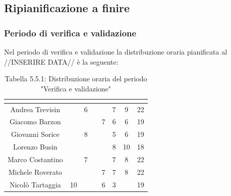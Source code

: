 \subsection{Ripianificazione a finire}

\subsubsection{Periodo di verifica e validazione}
Nel periodo di verifica e validazione la distribuzione oraria pianificata al //INSERIRE DATA// è la seguente:

\renewcommand{\arraystretch}{1.5}
\begin{table}[H]
\begin{center}
\begin{tabular}{|c|c|c|c|c|c|c|c|}
\hline
\rowcolor{title_row}
\textbf{\color{title_text}{Nome}} & \textbf{\color{title_text}{Resp.}} & \textbf{\color{title_text}{Ammi.}} & \textbf{\color{title_text}{Analist.}} & \textbf{\color{title_text}{Progett.}} & \textbf{\color{title_text}{Program.}} & \textbf{\color{title_text}{Verific.}} & \textbf{\color{title_text}{Totale}} \\ \hline
Andrea Trevisin  & & 6 & & & 7 & 9 & 22  \\ \hline
Giacomo Barzon   & & & & 7 & 6 & 6 & 19  \\ \hline
Giovanni Sorice  & & 8 & &  & 5 & 6 & 19  \\ \hline
Lorenzo Busin    & & & & & 8 & 10 & 18  \\ \hline
Marco Costantino & & 7 & & & 7 & 8 & 22  \\ \hline
Michele Roverato & & & & 7 & 7 & 8 & 22  \\ \hline
Nicolò Tartaggia & 10 & & & 6 & 3 & & 19  \\ \hline
\end{tabular}
\caption{Tabella 5.5.1: Distribuzione oraria del periodo "Verifica e validazione"\label{}}
\end{center}
\end{table}
\renewcommand{\arraystretch}{1}

